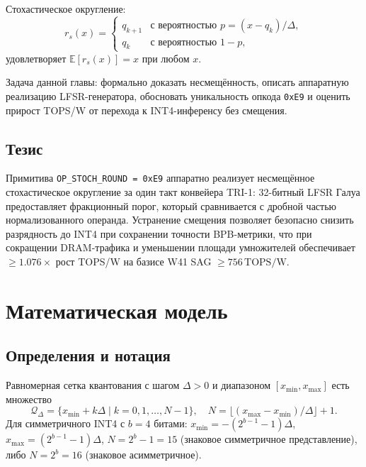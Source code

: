 Стохастическое округление:
\begin{equation}
  r_s(x) =
  \begin{cases}
    q_{k+1} & \text{с вероятностью } p = (x - q_k)/\Delta, \\
    q_k     & \text{с вероятностью } 1 - p,
  \end{cases}
  \label{eq:stoch-round}
\end{equation}
удовлетворяет $\mathbb{E}[r_s(x)] = x$ при любом $x$.

Задача данной главы: формально доказать несмещённость, описать
аппаратную реализацию LFSR-генератора, обосновать уникальность
опкода \texttt{0xE9} и оценить прирост TOPS/W от перехода
к INT4-инференсу без смещения.

\subsection{Тезис}
\label{ssec:glava88-thesis}

Примитива \texttt{OP\_STOCH\_ROUND = 0xE9} аппаратно реализует
несмещённое стохастическое округление за один такт конвейера TRI-1:
32-битный LFSR Галуа предоставляет фракционный порог, который
сравнивается с дробной частью нормализованного операнда.
Устранение смещения позволяет безопасно снизить разрядность до INT4
при сохранении точности BPB-метрики, что при сокращении DRAM-трафика
и уменьшении площади умножителей обеспечивает
$\geq 1{.}076\times$ рост TOPS/W на базисе W41 SAG
$\geq 756\,\text{TOPS/W}$.

\section{Математическая модель}
\label{sec:glava88-math}

\subsection{Определения и нотация}
\label{ssec:glava88-defs}

\begin{definition}
\label{def:quant-grid}
Равномерная сетка квантования с шагом $\Delta > 0$ и диапазоном
$[x_{\min}, x_{\max}]$ есть множество
\[
  \mathcal{Q}_\Delta = \{ x_{\min} + k\Delta \mid k = 0, 1, \ldots, N-1 \},
  \quad N = \lfloor (x_{\max} - x_{\min})/\Delta \rfloor + 1.
\]
Для симметричного INT4 с $b = 4$ битами:
$x_{\min} = -(2^{b-1}-1)\Delta$, $x_{\max} = (2^{b-1}-1)\Delta$,
$N = 2^b - 1 = 15$ (знаковое симметричное представление),
либо $N = 2^b = 16$ (знаковое асимметричное).
\end{definition}

